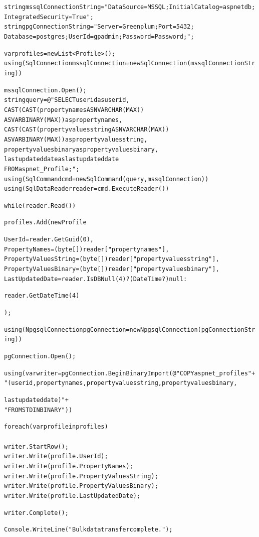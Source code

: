 \documentclass{article}[14pt]
\begin{document}
\begin{mdframed}[backgroundcolor=white, linecolor=black, roundcorner=5pt]
\begin{alltt}
string mssqlConnectionString = "Data Source=MSSQL;Initial Catalog=aspnetdb;
                                Integrated Security=True";
string pgConnectionString = "Server=Greenplum;Port=5432;
                            Database=postgres;User Id=gpadmin;Password=Password;";

var profiles = new List<Profile>();
using (SqlConnection mssqlConnection = new SqlConnection(mssqlConnectionString))
{
    mssqlConnection.Open();
    string query = @"SELECT userid as userid,
                    CAST(CAST(propertynames AS NVARCHAR(MAX)) 
                    AS VARBINARY(MAX)) as propertynames,
                    CAST(CAST(propertyvaluesstring AS NVARCHAR(MAX)) 
                    AS VARBINARY(MAX)) as propertyvaluesstring,
                    propertyvaluesbinary as propertyvaluesbinary,
                    lastupdateddate as lastupdateddate
                    FROM aspnet_Profile;";
    using (SqlCommand cmd = new SqlCommand(query, mssqlConnection))
    using (SqlDataReader reader = cmd.ExecuteReader())
    {
        while (reader.Read())
        {
            profiles.Add(new Profile
            {
                UserId = reader.GetGuid(0),
                PropertyNames = (byte[])reader["propertynames"],
                PropertyValuesString = (byte[])reader["propertyvaluesstring"],
                PropertyValuesBinary = (byte[])reader["propertyvaluesbinary"],
                LastUpdatedDate = reader.IsDBNull(4) ? (DateTime?)null : 
                
                reader.GetDateTime(4)
            });
        }
    }
}

using (NpgsqlConnection pgConnection = new NpgsqlConnection(pgConnectionString))
{
    pgConnection.Open();

    using (var writer = pgConnection.BeginBinaryImport(@"COPY aspnet_profiles " +
        "(userid, propertynames, propertyvaluesstring, propertyvaluesbinary, 
        
        lastupdateddate)" +
        " FROM STDIN BINARY"))
    {
        foreach (var profile in profiles)
        {
            writer.StartRow();
            writer.Write(profile.UserId);
            writer.Write(profile.PropertyNames);
            writer.Write(profile.PropertyValuesString);
            writer.Write(profile.PropertyValuesBinary);
            writer.Write(profile.LastUpdatedDate);
        }

        writer.Complete();
    }
}

Console.WriteLine("Bulk data transfer complete.");
\end{alltt}
\end{mdframed}
\end{document}
